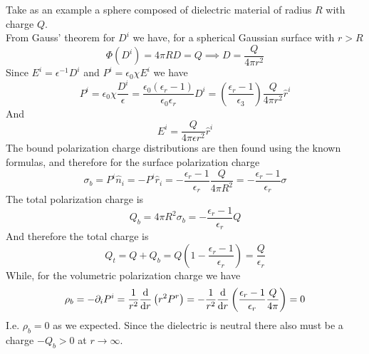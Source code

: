 \documentclass[../electromagnetism]{subfiles}
\begin{document}
\begin{eg}
	Take as an example a sphere composed of dielectric material of radius $R$ with charge $Q$.\\
	From Gauss' theorem for $D^i$ we have, for a spherical Gaussian surface with $r>R$
	\begin{equation*}
		\Phi\left( D^i \right)=4\pi RD=Q\implies D=\frac{Q}{4\pi r^2}
	\end{equation*}
	Since $E^i=\epsilon^{-1}D^i$ and $P^i=\epsilon_0\chi E^i$ we have
	\begin{equation*}
		P^i=\epsilon_0\chi\frac{D^i}{\epsilon}=\frac{\epsilon_0(\epsilon_r-1)}{\epsilon_0\epsilon_r}D^i=\left( \frac{\epsilon_r-1}{\epsilon_3} \right)\frac{Q}{4\pi r^2}\hat{r}^i
	\end{equation*}
	And
	\begin{equation*}
		E^i=\frac{Q}{4\pi\epsilon r^2}\hat{r}^i
	\end{equation*}
	The bound polarization charge distributions are then found using the known formulas, and therefore for the surface polarization charge
	\begin{equation*}
		\sigma_b=P^i\hat{n}_i=-P^i\hat{r}_i=-\frac{\epsilon_r-1}{\epsilon_r}\frac{Q}{4\pi R^2}=-\frac{\epsilon_r-1}{\epsilon_r}\sigma
	\end{equation*}
	The total polarization charge is
	\begin{equation*}
		Q_b=4\pi R^2\sigma_b=-\frac{\epsilon_r-1}{\epsilon_r}Q
	\end{equation*}
	And therefore the total charge is
	\begin{equation*}
		Q_t=Q+Q_b=Q\left( 1-\frac{\epsilon_r-1}{\epsilon_r} \right)=\frac{Q}{\epsilon_r}
	\end{equation*}
	While, for the volumetric polarization charge we have
	\begin{equation*}
		\rho_b=-\partial_iP^i=\frac{1}{r^2}\dv{r}\left( r^2P^r \right)=-\frac{1}{r^2}\dv{r}\left( \frac{\epsilon_r-1}{\epsilon_r}\frac{Q}{4\pi} \right)=0
	\end{equation*}
	I.e. $\rho_b=0$ as we expected. Since the dielectric is neutral there also must be a charge $-Q_b>0$ at $r\to\infty$.
\end{eg}
\end{document}

